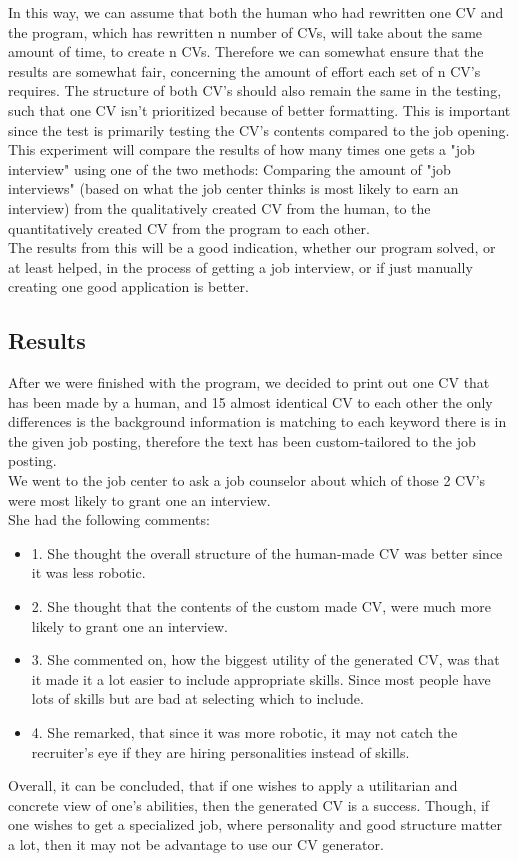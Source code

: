 In this way, we can assume that both the human who had rewritten one
CV and the program, which has rewritten n number of CVs,
will take about the same amount of time, to create n CVs.
Therefore we can somewhat ensure that the results are somewhat fair, concerning the amount of effort each set of n CV's requires.
The structure of both CV's should also remain the same in the testing, such that one CV isn't prioritized because of better formatting.
This is important since the test is primarily testing the CV's contents compared to the job opening. \\

This experiment will compare the results of how many times one gets a "job
interview" using one of the two methods: Comparing the amount of 
"job interviews" (based on what the job center thinks is most likely to earn an interview) 
from the qualitatively created CV from
the human, to the quantitatively created CV from the program to
each other. \\

The results from this will be a good indication, whether our program solved, or
at least helped, in the process of getting a job interview, or if just manually
creating one good application is better.

\subsection{Results}
After we were finished with the program, we decided to print out one CV that has been made by a human,
and 15 almost identical CV to each other the only differences is 
the background information is matching to each keyword there is in the given job posting, 
therefore the text has been custom-tailored to the job posting. \\

We went to the job center to ask a job counselor about which of those 2 CV's were most likely to grant one an interview. \\

She had the following comments:
\begin{itemize}
  \item 1. She thought the overall structure of the human-made CV was better since it was less robotic.
  \item 2. She thought that the contents of the custom made CV, were much more likely to grant one an interview.
  \item 3. She commented on, how the biggest utility of the generated CV, was that it made it a lot easier to include appropriate skills. Since most people have lots of skills but are bad at selecting which to include.
  \item 4. She remarked, that since it was more robotic, it may not catch the recruiter's eye if they are hiring personalities instead of skills.
\end{itemize}

Overall, it can be concluded, that if one wishes to apply a utilitarian and concrete view of one's abilities, then the generated CV is a success.
Though, if one wishes to get a specialized job, where personality and good structure matter a lot, then it may not be advantage to use our CV generator.

\clearpage